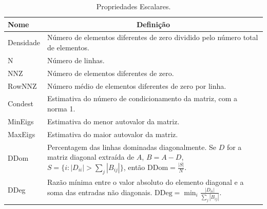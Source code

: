 \documentclass{pssbmac}
\begin{document}
\begin{table}
    \centering
    \caption{Propriedades Escalares.}
    \label{tab:scalar_features}
\begin{tabular}{@{}p{2cm}p{9cm}@{}}
    \toprule
    \textbf{Nome} &  \multicolumn{1}{c}{\textbf{Definição}} \\
    \midrule
    Densidade & Número de elementos diferentes de zero dividido pelo número total de elementos. \\
    N& Número de linhas. \\
    NNZ & Número de elementos diferentes de zero. \\
    RowNNZ & Número médio de elementos diferentes de zero por linha. \\
    Condest & Estimativa do número de condicionamento da matriz, com a norma 1. \\
    MinEigs & Estimativa do menor autovalor da matriz. \\
    MaxEigs & Estimativa do maior autovalor da matriz. \\
    DDom & Percentagem das linhas dominadas diagonalmente. Se $D$ for a matriz diagonal extraída de $A$, $B = A - D$, $S = \{ i: |D_{ii}| > \sum_j{|B_{ij}|}\}$, então $\text{DDom} = \frac{|S|}{N}.$\\
    DDeg & Razão mínima entre o valor absoluto do elemento diagonal e a soma das entradas não diagonais. $\text{DDeg} = \min_{i}\frac{|D_{ii}|}{\sum_j{|B_{ij}|}}$.\\
    \bottomrule
\end{tabular}
\end{table}
\end{document}
